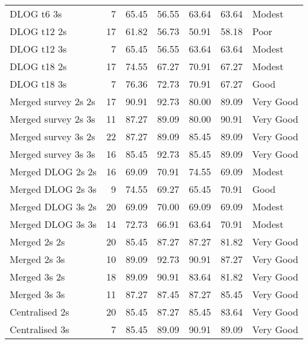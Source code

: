 \documentclass[
  12pt,
  a4paper,
]{book}
\begin{document}
\begin{longtable}[t]{lrrrrrl}
DLOG t6 3s & 7 & 65.45 & 56.55 & 63.64 & 63.64 & Modest\\
\rowcolor{gray!6}  DLOG t12 2s & 17 & 61.82 & 56.73 & 50.91 & 58.18 & Poor\\
DLOG t12 3s & 7 & 65.45 & 56.55 & 63.64 & 63.64 & Modest\\
\rowcolor{gray!6}  DLOG t18 2s & 17 & 74.55 & 67.27 & 70.91 & 67.27 & Modest\\
DLOG t18 3s & 7 & 76.36 & 72.73 & 70.91 & 67.27 & Good\\
\rowcolor{gray!6}  Merged survey 2s 2s & 17 & 90.91 & 92.73 & 80.00 & 89.09 & Very Good\\
Merged survey 2s 3s & 11 & 87.27 & 89.09 & 80.00 & 90.91 & Very Good\\
\rowcolor{gray!6}  Merged survey 3s 2s & 22 & 87.27 & 89.09 & 85.45 & 89.09 & Very Good\\
Merged survey 3s 3s & 16 & 85.45 & 92.73 & 85.45 & 89.09 & Very Good\\
\rowcolor{gray!6}  Merged DLOG 2s 2s & 16 & 69.09 & 70.91 & 74.55 & 69.09 & Modest\\
Merged DLOG 2s 3s & 9 & 74.55 & 69.27 & 65.45 & 70.91 & Good\\
\rowcolor{gray!6}  Merged DLOG 3s 2s & 20 & 69.09 & 70.00 & 69.09 & 69.09 & Modest\\
Merged DLOG 3s 3s & 14 & 72.73 & 66.91 & 63.64 & 70.91 & Modest\\
\rowcolor{gray!6}  Merged 2s 2s & 20 & 85.45 & 87.27 & 87.27 & 81.82 & Very Good\\
Merged 2s 3s & 10 & 89.09 & 92.73 & 90.91 & 87.27 & Very Good\\
\rowcolor{gray!6}  Merged 3s 2s & 18 & 89.09 & 90.91 & 83.64 & 81.82 & Very Good\\
Merged 3s 3s & 11 & 87.27 & 87.45 & 87.27 & 85.45 & Very Good\\
\rowcolor{gray!6}  Centralised 2s & 20 & 85.45 & 87.27 & 85.45 & 83.64 & Very Good\\
Centralised 3s & 7 & 85.45 & 89.09 & 90.91 & 89.09 & Very Good\\*
\end{longtable}
\endgroup{}

\begingroup\fontsize{10}{12}\selectfont
\end{document}
